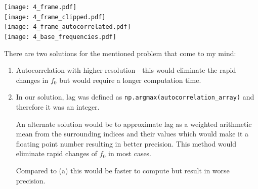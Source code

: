 \documentclass[a4paper, 11pt]{article}
\begin{document}
\begin{enumerate}
		\texttt{[image: 4\_frame.pdf]} \\
		\texttt{[image: 4\_frame\_clipped.pdf]} \\
		\texttt{[image: 4\_frame\_autocorrelated.pdf]} \\
		\texttt{[image: 4\_base\_frequencies.pdf]}

		There are two solutions for the mentioned problem that come to my mind:
		\begin{enumerate}
			\item
			Autocorrelation with higher resolution - this would eliminate the rapid changes in $f_0$
			but would require a longer computation time.
			\item
			In our solution, lag was defined as \texttt{np.argmax(autocorrelation\_array)} and therefore it was an integer.

			An alternate solution would be to approximate lag as a weighted arithmetic mean from the surrounding indices and their values
			which would make it a floating point number resulting in better precision.
			This method would eliminate rapid changes of $f_0$ in most cases.

			Compared to (a) this would be faster to compute but result in worse precision.
		\end{enumerate}
	\end{enumerate}
\end{document}
